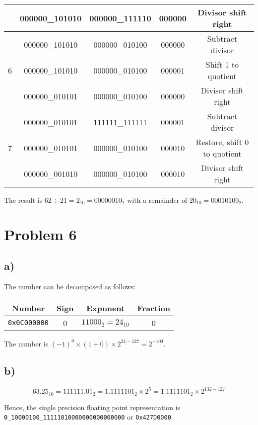 \documentclass[a4paper,12pt]{article}
\begin{document}
\begin{center}
\begin{tabular}{ccccc}
		& 000000\_101010 & 000000\_111110 & 000000 & Divisor shift right \\
		\hline
		\multirow{3}{*}{6} & 000000\_101010 & 000000\_010100 & 000000 & Subtract divisor \\
		& 000000\_101010 & 000000\_010100 & 000001 & Shift 1 to quotient \\
		& 000000\_010101 & 000000\_010100 & 000000 & Divisor shift right \\
		\hline
		\multirow{3}{*}{7} & 000000\_010101 & 111111\_111111 & 000001 & Subtract divisor \\
		& 000000\_010101 & 000000\_010100 & 000010 & Restore, shift 0 to quotient \\
		& 000000\_001010 & 000000\_010100 & 000010 & Divisor shift right \\
		\bottomrule
	\end{tabular}
\end{center}

The result is $62 \div 21 = 2_{10} = 00000010_2$ with a remainder of $20_{10} = 00010100_2$.

\section*{Problem 6}

\subsection*{a)}

The number can be decomposed as follows:

\begin{center}
	\begin{tabular}{cccc}
		\toprule
		\textbf{Number} & \textbf{Sign} & \textbf{Exponent} & \textbf{Fraction} \\
		\midrule
		\texttt{0x0C000000} & 0 & $11000_2 = 24_{10}$ & 0 \\
		\bottomrule
	\end{tabular}
\end{center}

The number is $(-1)^0 \times (1 + 0) \times 2^{24 - 127} = 2^{-103}$.

\subsection*{b)}

\begin{equation*}
	63.25_{10} = 111111.01_2 = 1.1111101_2 \times 2^5 = 1.1111101_2 \times 2^{132 - 127}
\end{equation*}

Hence, the single precision floating point representation is \texttt{0\_10000100\_11111010000000000000000} or \texttt{0x427D0000}.
\end{document}
